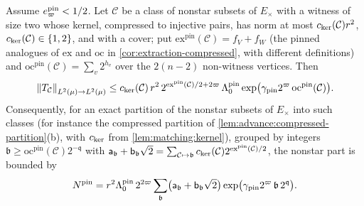 \begin{proposition}\label{prop:pinned-extraction}
Assume $e^{\rm pin}_\varpi<\frac12$. Let $\mathcal C$ be a class of nonstar subsets of
$E_\times$ with a witness of size two whose kernel, compressed to injective pairs,
has norm at most $c_{\rm ker}(\mathcal C)r^2$, $c_{\rm ker}(\mathcal C)\in\{1,2\}$,
and with a cover; put $\mathrm{ex}^{\mathrm{pin}}(\mathcal C)=f_V+f_W$ (the pinned analogues of $\mathrm{ex}$ and $\mathrm{oc}$ in \cref{cor:extraction-compressed}, with different definitions) and
$\mathrm{oc}^{\mathrm{pin}}(\mathcal C)=\sum_v2^{h_v}$ over the $2(n-2)$ non-witness vertices. Then
\begin{equation}\label{eq:push:pinnedclass}
 \norm{T_{\mathcal C}}_{L^2(\mu)\to L^2(\mu)}
 \le c_{\rm ker}(\mathcal C)\,r^2\,2^{\mathrm{ex}^{\mathrm{pin}}(\mathcal C)/2+2\varpi}\,
 \Lambda^{\rm pin}_0\exp\bigl(\gamma_{\rm pin}2^\varpi\,\mathrm{oc}^{\mathrm{pin}}(\mathcal C)\bigr).
\end{equation}
Consequently, for an exact partition of the nonstar subsets of $E_\times$ into such
classes (for instance the compressed partition of
\cref{lem:advance:compressed-partition}(b), with $c_{\rm ker}$ from
\cref{lem:matching:kernel}), grouped by integers
$\mathfrak b\ge\mathrm{oc}^{\mathrm{pin}}(\mathcal C)2^{-\mathfrak q}$ with
$\mathsf a_{\mathfrak b}+\mathsf b_{\mathfrak b}\sqrt2=\sum_{\mathcal C\mapsto\mathfrak b}
c_{\rm ker}(\mathcal C)2^{\mathrm{ex}^{\mathrm{pin}}(\mathcal C)/2}$, the nonstar part is bounded by
\[
 N^{\rm pin}=r^2\Lambda^{\rm pin}_0\,2^{2\varpi}\sum_{\mathfrak b}
 \bigl(\mathsf a_{\mathfrak b}+\mathsf b_{\mathfrak b}\sqrt2\bigr)
 \exp\bigl(\gamma_{\rm pin}2^\varpi\,\mathfrak b\,2^{\mathfrak q}\bigr).
\]
\end{proposition}

